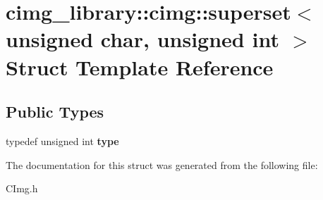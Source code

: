 \hypertarget{structcimg__library_1_1cimg_1_1superset_3_01unsigned_01char_00_01unsigned_01int_01_4}{\section{cimg\-\_\-library\-:\-:cimg\-:\-:superset$<$ unsigned char, unsigned int $>$ Struct Template Reference}
\label{structcimg__library_1_1cimg_1_1superset_3_01unsigned_01char_00_01unsigned_01int_01_4}
}
\subsection*{Public Types}
\begin{DoxyCompactItemize}
\item 
\hypertarget{structcimg__library_1_1cimg_1_1superset_3_01unsigned_01char_00_01unsigned_01int_01_4_ab6d7615d12ef9be042dee9224f2c41ed}{typedef unsigned int {\bfseries type}}\label{structcimg__library_1_1cimg_1_1superset_3_01unsigned_01char_00_01unsigned_01int_01_4_ab6d7615d12ef9be042dee9224f2c41ed}

\end{DoxyCompactItemize}


The documentation for this struct was generated from the following file\-:\begin{DoxyCompactItemize}
\item 
C\-Img.\-h\end{DoxyCompactItemize}
